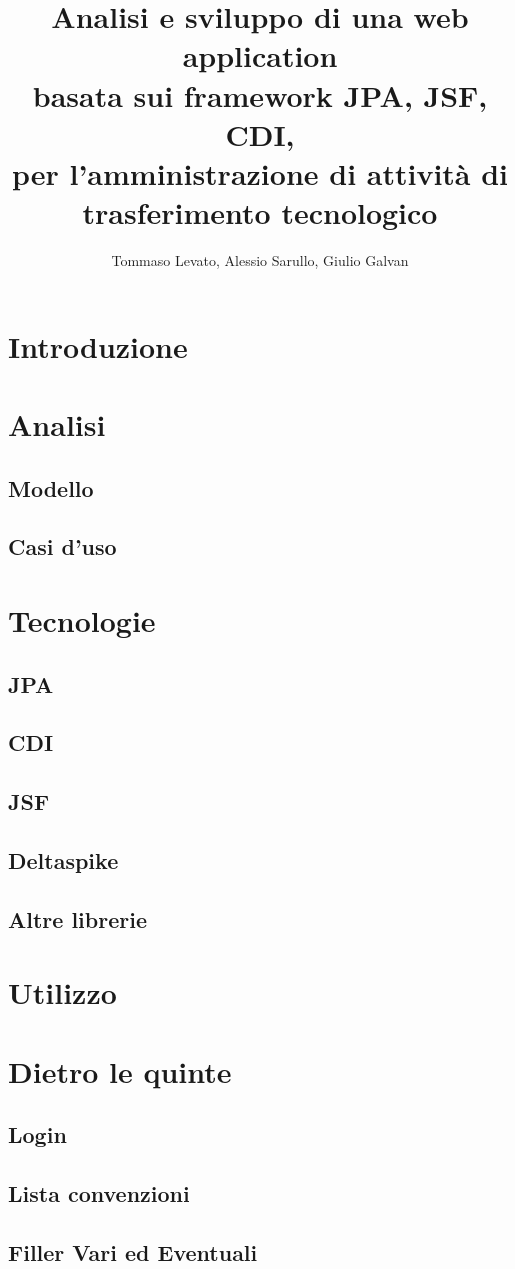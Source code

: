 \documentclass[a4paper,10pt]{report}
\title{Analisi e sviluppo di una web application \\
basata sui framework JPA, JSF, CDI, \\
per l'amministrazione di attività di trasferimento tecnologico}
\author{Tommaso Levato, Alessio Sarullo, Giulio Galvan}
\begin{document}
\maketitle

\begin{abstract}
\end{abstract}

\tableofcontents

\chapter{Introduzione}
\chapter{Analisi}
\section{Modello}


\section{Casi d'uso}

\chapter{Tecnologie}
\section{JPA}

\section{CDI} 
\label{cdi}

\section{JSF}

\section{Deltaspike}

\section{Altre librerie}

\chapter{Utilizzo}
\chapter{Dietro le quinte}
\section{Login}

\section{Lista convenzioni}


\section{Filler Vari ed Eventuali}
\end{document}
